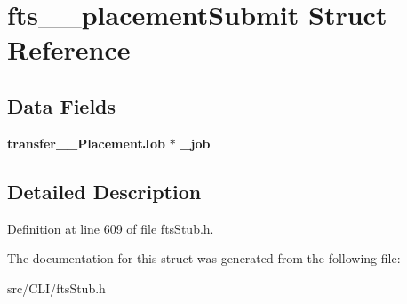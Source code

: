 \section{fts\_\-\_\-placementSubmit Struct Reference}
\label{structfts____placementSubmit}
\subsection*{Data Fields}
\begin{DoxyCompactItemize}
\item 
{\bf transfer\_\-\_\-PlacementJob} $\ast$ {\bfseries \_\-job}\label{structfts____placementSubmit_a3886d3679515799c7dd799a0a15d56e8}

\end{DoxyCompactItemize}


\subsection{Detailed Description}


Definition at line 609 of file ftsStub.h.



The documentation for this struct was generated from the following file:\begin{DoxyCompactItemize}
\item 
src/CLI/ftsStub.h\end{DoxyCompactItemize}
